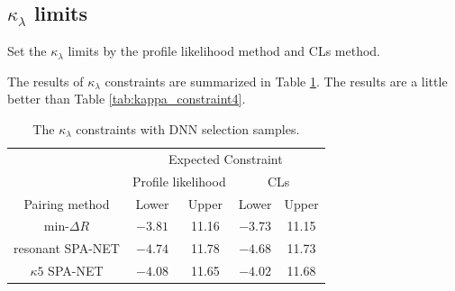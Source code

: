 \documentclass[12pt]{article}
\begin{document}
	\subsection{\texorpdfstring{$\kappa_\lambda$}{kappa} limits}%
	\label{sub:kappa_limits}
		Set the $\kappa_\lambda$ limits by the profile likelihood method and CLs method.

		The results of $\kappa_\lambda$ constraints are summarized in Table \ref{tab:kappa_constraint5}. The results are a little better than Table \ref{tab:kappa_constraint4}.
		\begin{table}[htpb]
			\centering
			\caption{The $\kappa_\lambda$ constraints with DNN selection samples.}
			\label{tab:kappa_constraint5}
			\begin{tabular}{c|cc|cc}
								  & \multicolumn{4}{c}{Expected Constraint}                          \\
								  & \multicolumn{2}{c}{Profile likelihood} & \multicolumn{2}{c}{CLs} \\ \hline
			Pairing method        & Lower              & Upper             & Lower      & Upper      \\ \hline
			$\text{min-}\Delta R$ & $-3.81$            & 11.16             & $-3.73$      & 11.15      \\
			resonant SPA-NET      & $-4.74$            & 11.78             & $-4.68$      & 11.73      \\
			$\kappa 5$ SPA-NET    & $-4.08$            & 11.65             & $-4.02$      & 11.68   
			\end{tabular}
		\end{table}
\end{document}
